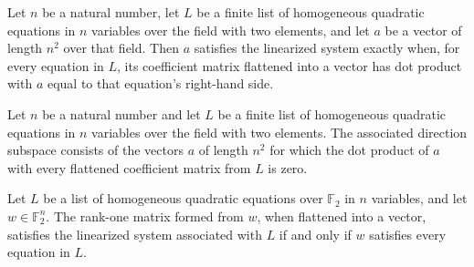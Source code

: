 \begin{definition}
\label{FABL.SatisfiesLinearizedQuadraticSystem}
\leanok
{}
Let $n$ be a natural number, let $L$ be a finite list of homogeneous quadratic equations
in $n$ variables over the field with two elements, and let $a$ be a vector of length
$n^2$ over that field. Then $a$ satisfies the linearized system exactly when, for every
equation in $L$, its coefficient matrix flattened into a vector has dot product with $a$
equal to that equation’s right-hand side.
\end{definition}

\begin{definition}
\label{FABL.homogeneousQuadraticSystemDirection}
\leanok
{}
Let $n$ be a natural number and let $L$ be a finite list of homogeneous quadratic
equations in $n$ variables over the field with two elements. The associated direction
subspace consists of the vectors $a$ of length $n^2$ for which the dot product of $a$
with every flattened coefficient matrix from $L$ is zero.
\end{definition}

\begin{theorem}
\label{FABL.satisfiesLinearized_rankOne_iff}
\leanok
{}
Let $L$ be a list of homogeneous quadratic equations over $\mathbb{F}_2$ in $n$
variables, and let $w\in\mathbb{F}_2^n$. The rank-one matrix formed from $w$, when
flattened into a vector, satisfies the linearized system associated with $L$ if and only
if $w$ satisfies every equation in $L$.
\end{theorem}

